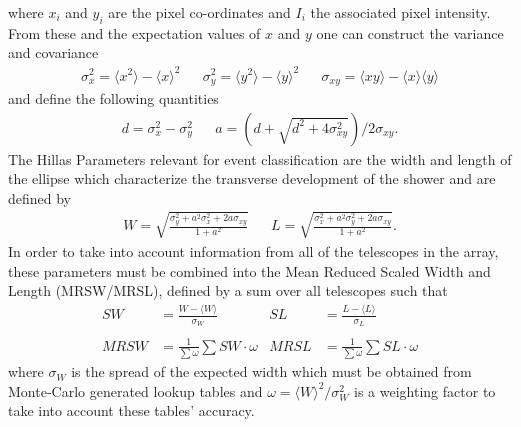 where $x_i$ and $y_i$ are the pixel co-ordinates and $I_i$ the associated pixel intensity. From these and the expectation values of $x$ and $y$ one can construct the variance and covariance
\begin{align*}
\sigma_x^2=\langle x^2 \rangle - \langle x \rangle^2&&\sigma_y^2=\langle y^2 \rangle - \langle y \rangle^2&&\sigma_{xy}=\langle xy \rangle - \langle x \rangle\langle y \rangle
\end{align*}
and define the following quantities
\begin{align*}
d=\sigma_x^2-\sigma_y^2&&a=(d+\sqrt{d^2+4\sigma_{xy}^2})/2\sigma_{xy}.
\end{align*}
The Hillas Parameters relevant for event classification are the width and length of the ellipse which characterize the transverse development of the shower and are defined by
\begin{align*}
W=\sqrt{\frac{\sigma_y^2+a^2\sigma_x^2+2a\sigma_{xy}}{1+a^2}}&&L=\sqrt{\frac{\sigma_x^2+a^2\sigma_y^2+2a\sigma_{xy}}{1+a^2}}.
\end{align*}
In order to take into account information from all of the telescopes in the array, these parameters must be combined into the Mean Reduced Scaled Width and Length (MRSW/MRSL), defined by a sum over all telescopes such that
\begin{align*}
SW&=\frac{W-\langle W \rangle}{\sigma_W}   &    SL&=\frac{L-\langle L \rangle}{\sigma_L}\\
\\ MRSW&=\frac{1}{\sum \omega}\sum SW\cdot \omega & MRSL&=\frac{1}{\sum \omega}\sum SL\cdot \omega
\end{align*}
where $\sigma_W$ is the spread of the expected width which must be obtained from Monte-Carlo generated lookup tables and $\omega=\langle W \rangle^2/\sigma_W^2$ is a weighting factor to take into account these tables' accuracy.

